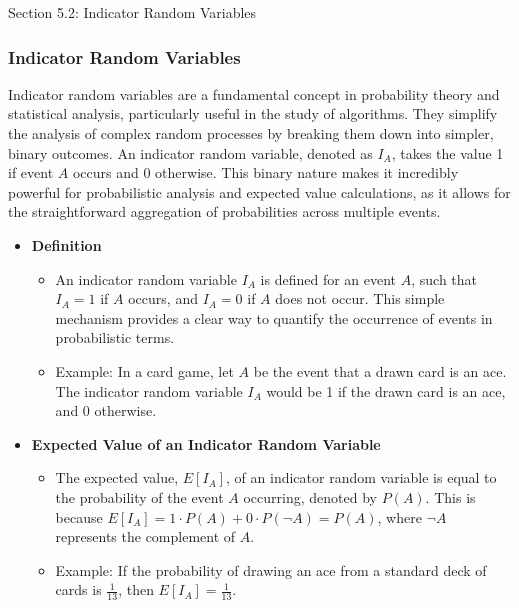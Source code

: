 \begin{notes}{Section 5.2: Indicator Random Variables}
    \subsubsection*{Indicator Random Variables}

    Indicator random variables are a fundamental concept in probability theory and statistical analysis, particularly useful in the study of algorithms. They simplify the analysis of complex random 
    processes by breaking them down into simpler, binary outcomes. An indicator random variable, denoted as $I_A$, takes the value 1 if event $A$ occurs and 0 otherwise. This binary nature makes 
    it incredibly powerful for probabilistic analysis and expected value calculations, as it allows for the straightforward aggregation of probabilities across multiple events.
    
    \begin{itemize}
        \item \textbf{Definition}
        \begin{itemize}
            \item An indicator random variable $I_A$ is defined for an event $A$, such that $I_A = 1$ if $A$ occurs, and $I_A = 0$ if $A$ does not occur. This simple mechanism provides 
            a clear way to quantify the occurrence of events in probabilistic terms.
            \item Example: In a card game, let $A$ be the event that a drawn card is an ace. The indicator random variable $I_A$ would be 1 if the drawn card is an ace, and 0 otherwise.
        \end{itemize}
        
        \item \textbf{Expected Value of an Indicator Random Variable}
        \begin{itemize}
            \item The expected value, $E[I_A]$, of an indicator random variable is equal to the probability of the event $A$ occurring, denoted by $P(A)$. This is because $E[I_A] = 1 \cdot P(A) + 0 \cdot P(\neg A) = P(A)$, 
            where $\neg A$ represents the complement of $A$.
            \item Example: If the probability of drawing an ace from a standard deck of cards is $\frac{1}{13}$, then $E[I_A] = \frac{1}{13}$.
        \end{itemize}
        

\end{itemize}
\end{notes}
